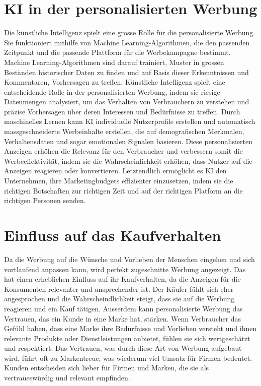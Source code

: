 \documentclass{article}
\begin{document}
 \section{KI in der personalisierten Werbung}

 Die künstliche Intelligenz spielt eine grosse Rolle für die personalisierte Werbung. Sie funktioniert mithilfe von Machine Learning-Algorithmen, die den passenden Zeitpunkt und die passende Plattform für die Werbekampagne bestimmt. Machine Learning-Algorithmen sind darauf trainiert, Muster in grossen Beständen historischer Daten zu finden und auf Basis dieser Erkenntnissen und Kommentaren, Vorhersagen zu treffen.
 Künstliche Intelligenz spielt eine entscheidende Rolle in der personalisierten Werbung, indem sie riesige Datenmengen analysiert, um das Verhalten von Verbrauchern zu verstehen und präzise Vorhersagen über deren Interessen und Bedürfnisse zu treffen. Durch maschinelles Lernen kann KI individuelle Nutzerprofile erstellen und automatisch massgeschneiderte Werbeinhalte erstellen, die auf demografischen Merkmalen, Verhaltensdaten und sogar emotionalen Signalen basieren. Diese personalisierten Anzeigen erhöhen die Relevanz für den Verbraucher und verbessern somit die Werbeeffektivität, indem sie die Wahrscheinlichkeit erhöhen, dass Nutzer auf die Anzeigen reagieren oder konvertieren. Letztendlich ermöglicht es KI den Unternehmen, ihre Marketingbudgets effizienter einzusetzen, indem sie die richtigen Botschaften zur richtigen Zeit und auf der richtigen Platform an die richtigen Personen senden.

 \section{Einfluss auf das Kaufverhalten}
Da die Werbung auf die Wünsche und Vorlieben der Menschen eingehen und sich vortlaufend anpassen kann, wird perfekt zugeschnitte Werbung angezeigt. Das hat einen erheblichen Einfluss auf ihr Kaufverhalten, da die Anzeigen für die Konsumenten relevanter und ansprechender ist. Der Käufer fühlt sich eher angesprochen und die Wahrscheindlichkeit steigt, dass sie auf die Werbung reagieren und ein Kauf tätigen. Ausserdem kann personalisierte Werbung das Vertrauen, das ein Kunde in eine Marke hat, stärken. Wenn Verbraucher das Gefühl haben, dass eine Marke ihre Bedürfnisse und Vorlieben versteht und ihnen relevante Produkte oder Dienstleistungen anbietet, fühlen sie sich wertgeschätzt und respektiert. Das Vertrauen, was durch diese Art von Werbung aufgebaut wird, führt oft zu Markentreue, was wiederum viel Umsatz für Firmen bedeutet. Kunden entscheiden sich lieber für Firmen und Marken, die sie als vertraueswürdig und relevant empfinden. 
\end{document}
